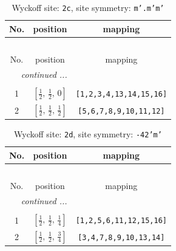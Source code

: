 \documentclass[fleqn,8pt]{jsarticle}
\begin{document}
\renewcommand{\arraystretch}{1.2}
\begin{longtable}{ccc}
\caption{Wyckoff site: {\tt 2c}, site symmetry: {\tt m'.m'm'}}
 \\
 \hline \hline
No. & position & mapping \\ \hline \endfirsthead

\multicolumn{2}{l}{\tablename\ \thetable{}} \\
 \hline \hline
No. & position & mapping \\ \hline \endhead

 \hline \hline
\multicolumn{2}{r}{\footnotesize\it continued ...} \\ \endfoot

 \hline \hline
\multicolumn{2}{r}{} \\ \endlastfoot

1 & $\left[ \frac{1}{2},\, \frac{1}{2},\, 0 \right]$ & {\tt [1,2,3,4,13,14,15,16]} \\ \hline
2 & $\left[ \frac{1}{2},\, \frac{1}{2},\, \frac{1}{2} \right]$ & {\tt [5,6,7,8,9,10,11,12]} \\
\end{longtable}
\renewcommand{\arraystretch}{1.2}
\begin{longtable}{ccc}
\caption{Wyckoff site: {\tt 2d}, site symmetry: {\tt -42'm'}}
 \\
 \hline \hline
No. & position & mapping \\ \hline \endfirsthead

\multicolumn{2}{l}{\tablename\ \thetable{}} \\
 \hline \hline
No. & position & mapping \\ \hline \endhead

 \hline \hline
\multicolumn{2}{r}{\footnotesize\it continued ...} \\ \endfoot

 \hline \hline
\multicolumn{2}{r}{} \\ \endlastfoot

1 & $\left[ \frac{1}{2},\, \frac{1}{2},\, \frac{1}{4} \right]$ & {\tt [1,2,5,6,11,12,15,16]} \\ \hline
2 & $\left[ \frac{1}{2},\, \frac{1}{2},\, \frac{3}{4} \right]$ & {\tt [3,4,7,8,9,10,13,14]} \\
\end{longtable}
\renewcommand{\arraystretch}{1.2}
\end{document}
